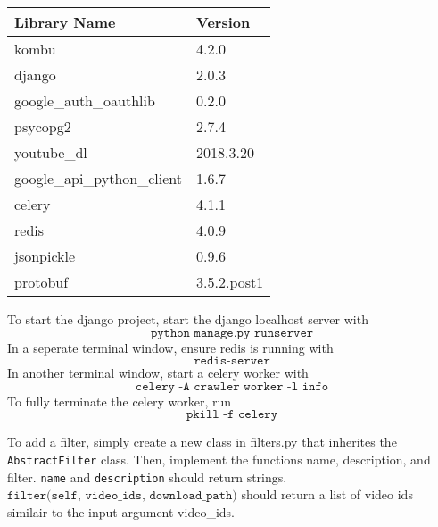 \documentclass[11pt]{memoir}
\begin{document}
\begin{center}
\begin{tabular}{@{}|l|l|@{}}
\toprule
Library Name                & Version     \\ \midrule
kombu                       & 4.2.0       \\ \midrule
django                      & 2.0.3       \\ \midrule
google\_auth\_oauthlib      & 0.2.0       \\ \midrule
psycopg2                    & 2.7.4       \\ \midrule
youtube\_dl                 & 2018.3.20   \\ \midrule
google\_api\_python\_client & 1.6.7       \\ \midrule
celery                      & 4.1.1       \\ \midrule
redis                       & 4.0.9       \\ \midrule
jsonpickle                  & 0.9.6       \\ \midrule
protobuf                    & 3.5.2.post1 \\ \bottomrule
\end{tabular}
\end{center}
To start the django project, start the django localhost server with
$$\texttt{python manage.py runserver}$$
In a seperate terminal window, ensure redis is running with
$$\texttt{redis-server}$$
In another terminal window, start a celery worker with
$$\texttt{celery -A crawler worker -l info}$$
To fully terminate the celery worker, run
$$\texttt{pkill -f celery}$$

To add a filter, simply create a new class in filters.py that inherites the
\texttt{AbstractFilter} class. Then, implement the functions name, description,
and filter. \texttt{name} and \texttt{description} should return strings.
$\texttt{filter(self, video_ids, download_path)}$
should return a list of video ids
similair to the input argument video_ids.
\end{document}

